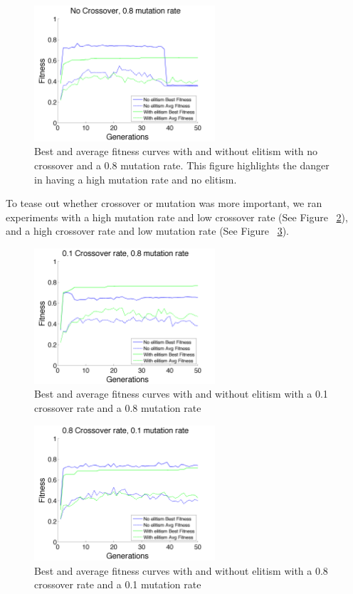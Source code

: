 \documentclass[11pt]{article}
\begin{document}
\begin{figure}[H]
 \centering
  \includegraphics[width=0.6\textwidth,height=0.2\textheight]{figures/fitness08mut0crossDrop.png}
  \caption{Best and average fitness curves with and without elitism with no crossover and a 0.8 mutation rate. This figure highlights the danger in having a high mutation rate and no elitism.}
  \label{fig:fig4}  
\end{figure}

To tease out whether crossover or mutation was more important, we ran experiments with a high mutation rate and low crossover rate (See Figure ~\ref{fig:fig5}), and a high crossover rate and low mutation rate (See Figure ~\ref{fig:fig6}). 

\begin{figure}[H]
 \centering
  \includegraphics[width=0.6\textwidth,height=0.2\textheight]{figures/fitness08mut01cross.png}
  \caption{Best and average fitness curves with and without elitism with a 0.1 crossover rate and a 0.8 mutation rate}
  \label{fig:fig5}  
\end{figure}

\begin{figure}[H]
 \centering
  \includegraphics[width=0.6\textwidth,height=0.2\textheight]{figures/fitness01mut08cross.png}
  \caption{Best and average fitness curves with and without elitism with a 0.8 crossover rate and a 0.1 mutation rate}
  \label{fig:fig6}  
\end{figure}
\end{document}
